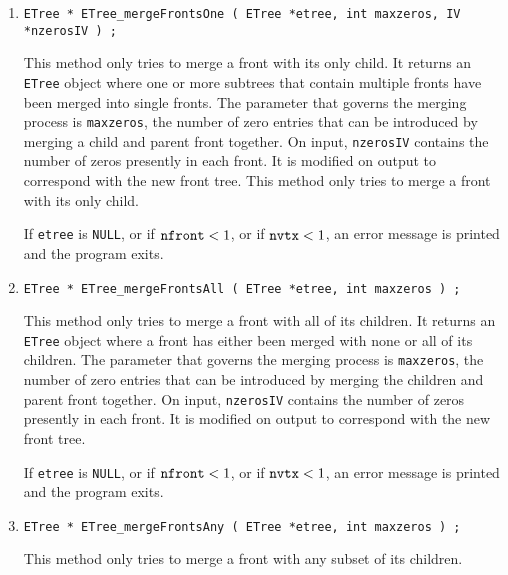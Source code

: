 \begin{enumerate}
\item
\begin{verbatim}
ETree * ETree_mergeFrontsOne ( ETree *etree, int maxzeros, IV *nzerosIV ) ;
\end{verbatim}
This method only tries to merge a front with its only child.
It returns an {\tt ETree} object where one or more 
subtrees that contain multiple fronts 
have been merged into single fronts.
The parameter that governs the merging process is {\tt maxzeros},
the number of zero entries that can be introduced by merging
a child and parent front together.
On input, {\tt nzerosIV} contains the number of zeros presently in
each front.
It is modified on output to correspond with the new front tree.
This method only tries to merge a front with its only child.
\par {}
If {\tt etree} is {\tt NULL},
or if ${\tt nfront} < 1$,
or if ${\tt nvtx} < 1$,
an error message is printed and the program exits.
\item
\begin{verbatim}
ETree * ETree_mergeFrontsAll ( ETree *etree, int maxzeros ) ;
\end{verbatim}
This method only tries to merge a front with all of its children.
It returns an {\tt ETree} object where a front
has either been merged with none or all of its children.
The parameter that governs the merging process is {\tt maxzeros},
the number of zero entries that can be introduced by merging
the children and parent front together.
On input, {\tt nzerosIV} contains the number of zeros presently in
each front.
It is modified on output to correspond with the new front tree.
\par {}
If {\tt etree} is {\tt NULL},
or if ${\tt nfront} < 1$,
or if ${\tt nvtx} < 1$,
an error message is printed and the program exits.
\item
\begin{verbatim}
ETree * ETree_mergeFrontsAny ( ETree *etree, int maxzeros ) ;
\end{verbatim}
This method only tries to merge a front with any subset of its children.

\end{enumerate}
